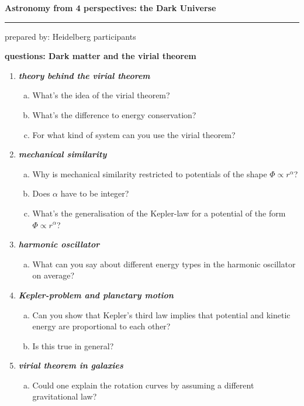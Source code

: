 \documentclass[a4paper,12pt]{article}
\newcommand{\question}[1]{\textbf{\textit{#1}}}
\newcommand{\HRule}{\rule{\linewidth}{0.3mm}}
\begin{document}
\pagestyle{empty}

\begin{center}
\LARGE \textbf{Astronomy from 4 perspectives: the Dark Universe}
\HRule
\end{center}
\begin{flushright}
prepared by: Heidelberg participants
\end{flushright}
\begin{center}
{\Large \textbf{questions: Dark matter and the virial theorem}}
\end{center}
\vspace{5mm}

\begin{enumerate}

\item \question{theory behind the virial theorem}
\begin{enumerate}[(a)]
\item{What's the idea of the virial theorem?}
\item{What's the difference to energy conservation?}
\item{For what kind of system can you use the virial theorem?}
\end{enumerate}

\item \question{mechanical similarity}
\begin{enumerate}[(a)]
\item{Why is mechanical similarity restricted to potentials of the shape $\Phi\propto r^\alpha$?}
\item{Does $\alpha$ have to be integer?}
\item{What's the generalisation of the Kepler-law for a potential of the form $\Phi\propto r^\alpha$?}
\end{enumerate}

\item \question{harmonic oscillator}
\begin{enumerate}[(a)]
\item{What can you say about different energy types in the harmonic oscillator on average?}
\end{enumerate}

\item \question{Kepler-problem and planetary motion}
\begin{enumerate}[(a)]
\item{Can you show that Kepler's third law implies that potential and kinetic energy are proportional to each other?}
\item{Is this true in general?}
\end{enumerate}

\item \question{virial theorem in galaxies}\\
\begin{enumerate}[(a)]
\item{Could one explain the rotation curves by assuming a different gravitational law?}
\end{enumerate}

\end{enumerate}
\end{document}
